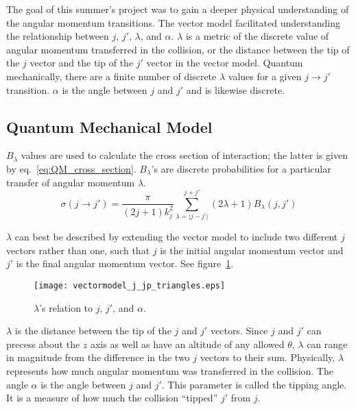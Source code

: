 \documentclass[letterpaper,titlepage,12pt]{article}
\begin{document}
The goal of this summer's project was to gain a deeper physical understanding
of the angular momentum transitions.  The vector model facilitated
understanding the relationship between $j$, $j'$, $\lambda$, and $\alpha$.
$\lambda$ is a metric of the discrete value of angular momentum transferred in
the collision, or the distance between the tip of the $j$ vector and the tip of
the $j'$ vector in the vector model.  Quantum mechanically, there are a finite
number of discrete $\lambda$ values for a given $j\rightarrow j'$ transition.
$\alpha$ is the angle between $j$ and $j'$ and is likewise discrete.

\subsection{Quantum Mechanical Model}
$B_\lambda$ values are used to calculate the cross section of interaction; the
latter is given by eq.~\ref{eq:QM_cross_section}.  $B_\lambda$'s are discrete
probabilities for a particular transfer of angular momentum $\lambda$.
\begin{equation}
    \sigma(j\rightarrow j')=\frac{\pi}{(2j+1)k_j^2}{\sum_{\lambda=\lvert j-j'\rvert}^{j+j'} {(2\lambda+1)B_\lambda(j,j')}}
    \label{eq:QM_cross_section}
\end{equation}

$\lambda$ can best be described by extending the vector model to include two
different $j$ vectors rather than one, such that $j$ is the initial angular
momentum vector and $j'$ is the final angular momentum vector.  See
figure~\ref{fig:vectormodel_j_jp}.
\begin{figure}[ht!]
    \centering
    \texttt{[image: vectormodel\_j\_jp\_triangles.eps]}
    \caption{$\lambda$'s relation to $j$, $j'$, and $\alpha$.}
\label{fig:vectormodel_j_jp}
\end{figure}
$\lambda$ is the distance between the tip of the $j$ and $j'$ vectors.  Since
$j$ and $j'$ can precess about the $z$ axis as well as have an altitude of any
allowed $\theta$, $\lambda$ can range in magnitude from the difference in the
two $j$ vectors to their sum.  Physically, $\lambda$ represents how much
angular momentum was transferred in the collision.  The angle $\alpha$ is the
angle between $j$ and $j'$.  This parameter is called the tipping angle.  It is
a measure of how much the collision ``tipped'' $j'$ from $j$.
\end{document}
